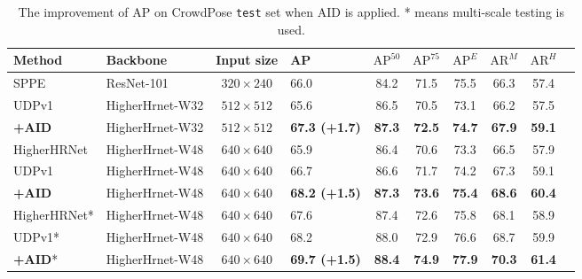\documentclass[final]{cvpr}
\begin{document}
\begin{table*}
\footnotesize
\begin{center}
\begin{tabular}{l|l|c|lcccccc}

\hline
Method                           & Backbone      &Input size             &AP                     & $\text{AP}^{50}$ & $\text{AP}^{75}$   & $\text{AP}^{E}$   & $\text{AR}^{M}$       &$\text{AR}^{H}$ \\

\hline
SPPE \cite{Crowdpose}             & ResNet-101    &$320\times240$         &66.0                   & 84.2             & 71.5               & 75.5              &66.3                   &57.4\\
UDPv1 \cite{UDP}                  &HigherHrnet-W32&$512\times512$         &65.6                   & 86.5             & 70.5               & 73.1              &66.2                   &57.5\\
\textbf{+AID}                    &HigherHrnet-W32&$512\times512$         &\textbf{67.3 (+1.7)}    & \textbf{87.3}    &\textbf{72.5}       & \textbf{74.7}     &\textbf{67.9}          &\textbf{59.1}\\
HigherHRNet \cite{Higher}         &HigherHrnet-W48&$640\times640$         &65.9                   & 86.4             & 70.6               & 73.3              &66.5                   &57.9\\
UDPv1 \cite{UDP}                  &HigherHrnet-W48&$640\times640$         &66.7                   & 86.6             & 71.7               & 74.2              &67.3                   &59.1\\
\textbf{+AID}                    &HigherHrnet-W48&$640\times640$         &\textbf{68.2 (+1.5)}    & \textbf{87.3}    &\textbf{73.6}       & \textbf{75.4}     &\textbf{68.6}          &\textbf{60.4}\\
\hline
HigherHRNet* \cite{Higher}        &HigherHrnet-W48&$640\times640$         &67.6                   & 87.4             & 72.6               & 75.8              &68.1                   &58.9\\
UDPv1* \cite{UDP}                  &HigherHrnet-W48&$640\times640$         &68.2                   & 88.0             & 72.9               & 76.6              &68.7                   &59.9\\
\textbf{+AID}*                   &HigherHrnet-W48&$640\times640$         &\textbf{69.7 (+1.5)}    & \textbf{88.4}    &\textbf{74.9}       & \textbf{77.9}     &\textbf{70.3}          &\textbf{61.4}\\
\hline
\end{tabular}
\end{center}
\caption{The improvement of AP on CrowdPose \texttt{test} set when AID is applied. * means multi-scale testing is used.}
\label{tab:crowdpose}
\end{table*}
\end{document}
